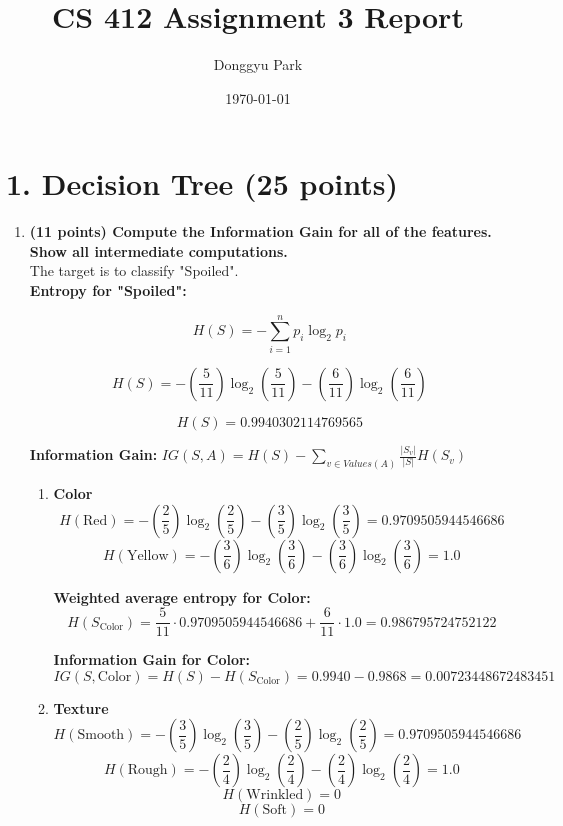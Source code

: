 \documentclass[12pt]{article}
\title{CS 412 Assignment 3 Report}
\author{Donggyu Park}
\date{\today}
\begin{document}
\maketitle

\section*{1. Decision Tree (25 points)}

\begin{enumerate}[label=(\alph*)]
    \item \textbf{(11 points) Compute the Information Gain for all of the features. Show all intermediate computations.}
    \\ The target is to classify "Spoiled".
    \\ \textbf{Entropy for "Spoiled":}

        $$ H(S) = -\sum_{i=1}^{n} p_i \log_2 p_i $$ 
  
        $$ H(S) = - \left(\frac{5}{11}\right) \log_2\left(\frac{5}{11}\right) - \left(\frac{6}{11}\right) \log_2\left(\frac{6}{11}\right) $$ 

        $$ H(S) = 0.9940302114769565 $$

    \textbf{Information Gain:} $IG(S, A) = H(S) - \sum_{v \in Values(A)} \frac{|S_v|}{|S|} H(S_v)$
    \begin{enumerate}[label=\roman*.]
        \item \textbf{Color} 
            $$H(\text{Red}) = - \left(\frac{2}{5}\right) \log_2\left(\frac{2}{5}\right) - \left(\frac{3}{5}\right) \log_2\left(\frac{3}{5}\right) = 0.9709505944546686$$
            $$H(\text{Yellow}) = - \left(\frac{3}{6}\right) \log_2\left(\frac{3}{6}\right) - \left(\frac{3}{6}\right) \log_2\left(\frac{3}{6}\right) = 1.0$$

            \textbf{Weighted average entropy for Color:}
            $$H(S_{\text{Color}}) = \frac{5}{11} \cdot 0.9709505944546686 + \frac{6}{11} \cdot 1.0 = 0.986795724752122$$

            \textbf{Information Gain for Color:}
            $$IG(S, \text{Color}) = H(S) - H(S_{\text{Color}}) = 0.9940 - 0.9868 = 0.00723448672483451$$

        \item \textbf{Texture}
            $$H(\text{Smooth}) = - \left(\frac{3}{5}\right) \log_2\left(\frac{3}{5}\right) - \left(\frac{2}{5}\right) \log_2\left(\frac{2}{5}\right) = 0.9709505944546686$$
            $$H(\text{Rough}) = - \left(\frac{2}{4}\right) \log_2\left(\frac{2}{4}\right) - \left(\frac{2}{4}\right) \log_2\left(\frac{2}{4}\right) = 1.0$$
            $$H(\text{Wrinkled}) = 0$$
            $$H(\text{Soft}) = 0$$


\end{enumerate}
\end{enumerate}
\end{document}
